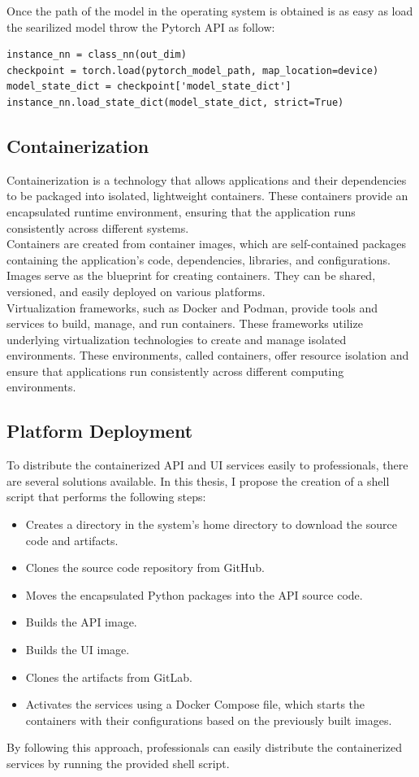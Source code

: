 Once the path of the model in the operating system is obtained is as easy as load the searilized model throw the Pytorch API as follow:

\begin{Verbatim}[fontsize=\small]
instance_nn = class_nn(out_dim)
checkpoint = torch.load(pytorch_model_path, map_location=device)
model_state_dict = checkpoint['model_state_dict']
instance_nn.load_state_dict(model_state_dict, strict=True)
\end{Verbatim}

\subsection{Containerization}

Containerization is a technology that allows applications and their dependencies to be packaged into isolated, lightweight containers. These containers provide an encapsulated runtime environment, ensuring that the application runs consistently across different systems. \\

Containers are created from container images, which are self-contained packages containing the application's code, dependencies, libraries, and configurations. Images serve as the blueprint for creating containers. They can be shared, versioned, and easily deployed on various platforms. \\

Virtualization frameworks, such as Docker and Podman, provide tools and services to build, manage, and run containers. These frameworks utilize underlying virtualization technologies to create and manage isolated environments. These environments, called containers, offer resource isolation and ensure that applications run consistently across different computing environments.

\subsection{Platform Deployment}

To distribute the containerized API and UI services easily to professionals, there are several solutions available. In this thesis, I propose the creation of a shell script that performs the following steps:

\begin{itemize}
\item Creates a directory in the system's home directory to download the source code and artifacts.
\item Clones the source code repository from GitHub.
\item Moves the encapsulated Python packages into the API source code.
\item Builds the API image.
\item Builds the UI image.
\item Clones the artifacts from GitLab.
\item Activates the services using a Docker Compose file, which starts the containers with their configurations based on the previously built images.\end{itemize}


By following this approach, professionals can easily distribute the containerized services by running the provided shell script.


